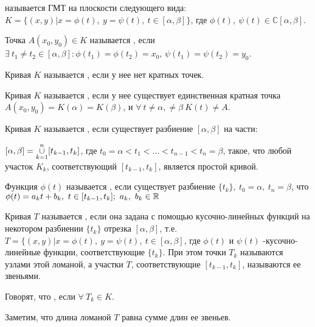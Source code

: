 \begin{opred}
 называется ГМТ на плоскости следующего вида: $K=\{(x,y)|x=\phi(t),\ y=\psi(t),\ t\in[\alpha,\beta]\}$, где $\phi(t),\ \psi(t)\in\mathbb{C}[\alpha,\beta]$.
\end{opred}
\begin{opred}
Точка $A(x_0,y_0)\in K$ называется , если $\exists\ t_1\neq t_2\in[\alpha,\beta]\colon\phi(t_1)=\phi(t_2)=x_0$, $\psi(t_1)=\psi(t_2)=y_0$.
\end{opred}
\begin{opred}
Кривая $K$ называется , если у нее нет кратных точек.
\end{opred}
\begin{opred}
Кривая $K$ называется , если у нее существует единственная кратная точка $A(x_0,y_0)=K(\alpha)=K(\beta)$, и $\forall\ t\neq\alpha,\neq\beta\ K(t)\neq A$.
\end{opred}
\begin{opred}
Кривая $K$ называется , если существует разбиение $[\alpha,\beta]$ на части:

$[\alpha,\beta]=\underset{k=1}{\overset{n}{\cup}}[t_{k-1},t_k]$, где $t_0=\alpha<t_1<\ldots<t_{n-1}<t_n=\beta$, такое, что любой участок $K_k$, соответствующий $[t_{k-1},t_k]$, является простой кривой.
\end{opred}
\begin{opred}
Функция $\phi(t)$ называется , если существует разбиение $\{t_k\},\ t_0=\alpha,\ t_n=\beta$, что $\phi(t)=a_kt+b_k,\ t\in[t_{k-1},t_k];\ a_k,\ b_k\in\R$
\end{opred}
\begin{opred}
Кривая $T$ называется , если она задана с помощью кусочно-линейных функций на некотором разбиении $\{t_k\}$ отрезка $[\alpha,\beta]$, т.е. $T=\{(x,y)|x=\phi(t),\ y=\psi(t),\ t\in[\alpha,\beta]$, где $\phi(t)$ и $\psi(t)$ -кусочно-линейные функции, соответствующие $\{t_k\}$. При этом точки $T_k$ называются узлами этой ломаной, а участки $T$, соответствующие $[t_{k-1},t_k]$, называются ее звеньями.
\end{opred}
\begin{opred}
Говорят, что , если $\forall\ T_k\in K$.
\end{opred}
\begin{remark}
Заметим, что длина ломаной $T$ равна сумме длин ее звеньев.
\end{remark}
